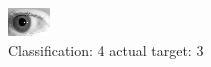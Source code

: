 \begin{figure}[h!]
\begin{center}
\includegraphics[width=0.60\columnwidth]{figures/ID299_class_4_target_3.png}
\end{center}
\caption{ Classification: 4 actual target: 3}
\label{fig:ID299_class_4_target_3}
\end{figure}
